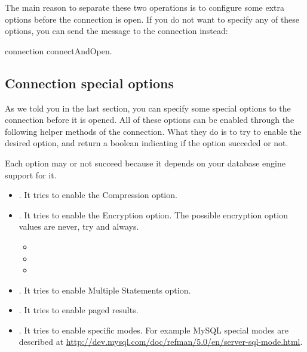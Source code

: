 \documentclass[a4paper,10pt,twoside]{book}
\begin{document}
The main reason to separate these two operations is to configure some extra options before the connection is open.  If you do not want to specify any of these options, you can send the  message to the connection instead:

\begin{code}{}
connection connectAndOpen.
\end{code}

\subsection{Connection special options}

As we told you in the last section, you can specify some special options to the connection before it is opened.  All of these options can be enabled through the following helper methods of the connection.  What they do is to try to enable the desired option, and return a boolean indicating if the option succeded or not.

Each option may or not succeed because it depends on your database engine support for it.

\begin{itemize}
\item {}. It tries to enable the Compression option.

\item {}. It tries to enable the Encryption option.  The possible encryption option values are never, try and always.
\begin{itemize}
    \item {}
    \item {}
    \item {}
\end{itemize}

\item {}. It tries to enable Multiple Statements option. 

\item {}. It tries to enable paged results.

\item {}.
	It tries to enable specific modes. For example MySQL special modes are described at \url{http://dev.mysql.com/doc/refman/5.0/en/server-sql-mode.html}.
\end{itemize}
\end{document}
